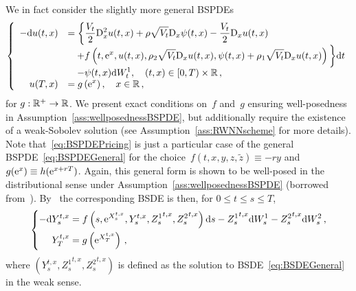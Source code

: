 We in fact consider the slightly more general BSPDEs
\begin{equation}\label{eq:BSPDEGeneral}
\left\{\begin{array}{rl}
-\mathrm{d} u(t,x) &= \displaystyle \bigg\{\frac{V_{t}}{2} \mathrm{D}_{x}^{2} u(t,x)+\rho \sqrt{V_{t}} \mathrm{D}_{x} \psi(t,x)-\frac{V_{t}}{2} \mathrm{D}_{x} u(t,x) \\
& \quad \displaystyle + f\left(t, \mathrm{e}^{x}, u(t,x), \rho_2\sqrt{V_{t}} \mathrm{D}_{x} u(t,x), \psi(t,x)+ \rho_1 \sqrt{V_{t}} \mathrm{D}_{x} u(t,x)\right)\bigg\} \mathrm{d} t \\
& \quad \displaystyle -\psi(t,x) \mathrm{d} W^1_{t}, \quad(t, x) \in[0, T) \times \mathbb{R}\,, \\
u(T,x) &= \displaystyle g \left(\mathrm{e}^{x}\right), \quad x \in \mathbb{R}\,,
\end{array}\right.
\end{equation}
for $g:\mathbb{R}^+\rightarrow \mathbb{R}$. We present exact conditions on~$f$ and~$g$ ensuring well-posedness in Assumption~\ref{ass:wellposednessBSPDE},
but additionally require the existence of a weak-Sobolev solution (see Assumption~\ref{ass:RWNNscheme} for more details). 
Note that~\eqref{eq:BSPDEPricing} is just a particular case of the general BSPDE~\eqref{eq:BSPDEGeneral} for the choice~${f(t, x, y, z, \widetilde{z}) \equiv -ry}$ and~${g(\mathrm{e}^{x})\equiv h(\mathrm{e}^{x+rT})}$. 
Again, this general form is shown to be well-posed in the distributional sense under Assumption~\ref{ass:wellposednessBSPDE} (borrowed from~\cite{Bayer2022PricingSPDEs}). 
By~\cite{Briand2003LpEquations} the corresponding BSDE is then,
for $0 \leq t \leq s \leq T$,
\begin{equation}\label{eq:BSDEGeneral}
\left\{\begin{aligned}
-\mathrm{d} Y_{s}^{t, x} &=f\left(s, \mathrm{e}^{X_{s}^{t, x}}, Y_{s}^{t, x}, {Z_{s}^{1}}^{t, x}, {Z_{s}^{2}}^{t, x}\right) \mathrm{d} s - {Z_{s}^{1}}^{t, x} \mathrm{d} W^1_{s} - {Z_{s}^{2}}^{t, x} \mathrm{d} W^2_{s}\,, \\
Y_{T}^{t, x} &=g\left(\mathrm{e}^{X_{T}^{t, x}}\right)\,,
\end{aligned}\right.
\end{equation}
where $(Y_{s}^{t, x}, {Z_{s}^{1}}^{t, x}, {Z_{s}^{2}}^{t, x})$ is defined as the solution to BSDE~\eqref{eq:BSDEGeneral} in the weak sense. 

